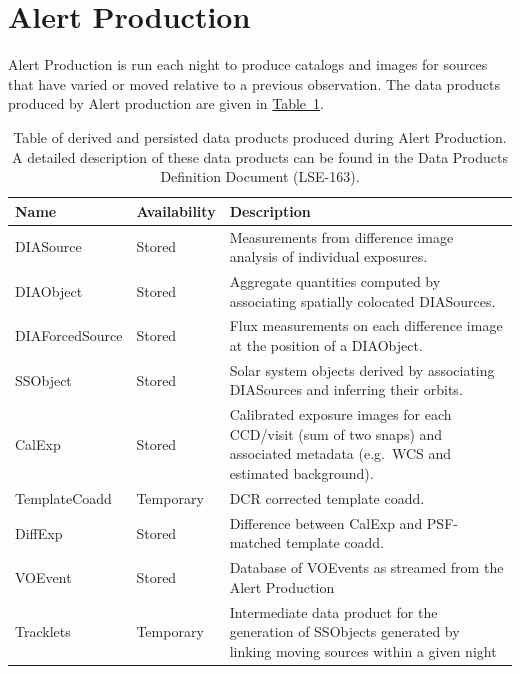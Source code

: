\section{Alert Production}
\label{sec:ap}



Alert Production is run each night to produce catalogs and images for sources that have varied or moved relative to a previous observation.  The data products produced by Alert production are given in  \hyperref[table:ap_data_products]{Table~\ref{table:ap_data_products}}.

\begin{table}
\small
\begin{tabularx}{\textwidth}{ | l | l | X | }
  \hline
  {\bf Name} & {\bf Availability} & {\bf Description} \\
  \hline
  DIASource & Stored &
  Measurements from difference image analysis of individual exposures. \\
  \hline
  DIAObject& Stored &
  Aggregate quantities computed by associating spatially colocated DIASources. \\
  \hline
  DIAForcedSource & Stored &
  Flux measurements on each difference image at the position of a DIAObject. \\
  \hline
  SSObject & Stored &
  Solar system objects derived by associating DIASources and inferring their orbits. \\
  \hline
  CalExp & Stored &
  Calibrated exposure images for each CCD/visit (sum of two snaps) and associated metadata (e.g.\ WCS and estimated background). \\
  \hline 
TemplateCoadd & Temporary &
  DCR corrected template coadd. \\
  \hline 
  DiffExp & Stored &
  Difference between CalExp and PSF-matched template coadd. \\
  \hline 
  VOEvent & Stored &
  Database of VOEvents as streamed from the Alert Production\\
  \hline 
 Tracklets & Temporary &
  Intermediate data product for the generation of SSObjects generated by linking moving sources within a given night \\
  \hline 



  \hline
\end{tabularx}
\caption{Table of derived and persisted data products produced during  Alert Production.  A detailed  description of these data products can be found in the Data Products Definition Document (LSE-163).
\label{table:ap_data_products}}
\end{table}


